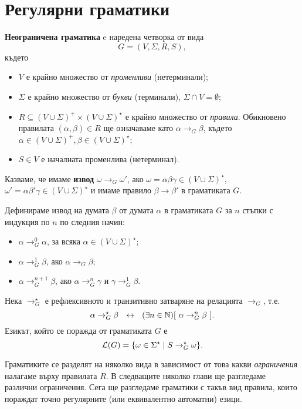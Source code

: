 \section{Регулярни граматики}
\label{sect:regular-grammar}
{\bf Неограничена граматика} e наредена четворка от вида
\[G = (V, \Sigma, R, S),\]
където
\begin{itemize}
\item
  $V$ е крайно множество от {\em променливи} (нетерминали);
\item
  $\Sigma$ е крайно множество от {\em букви} (терминали), $\Sigma \cap V = \emptyset$;
\item
  $R \subseteq (V\cup\Sigma)^+ \times (V \cup \Sigma)^\star$ е крайно множество от {\em правила}.
  Обикновено правилата $(\alpha, \beta) \in R$ ще означаваме като 
  $\alpha \to_G \beta$, където $\alpha \in (V \cup \Sigma)^+, \beta \in (V \cup \Sigma)^\star$;
\item
  $S \in V$ е началната променлива (нетерминал). 
\end{itemize}
Казваме, че имаме {\bf извод} $\omega \to_G \omega'$, ако $\omega = \alpha\beta\gamma \in (V\cup\Sigma)^\star$,
$\omega' = \alpha\beta'\gamma \in (V\cup\Sigma)^\star$ и имаме правило $\beta \to \beta'$ в граматиката $G$.

Дефинираме извод на думата $\beta$ от думата $\alpha$ в граматиката $G$ за $n$ стъпки с индукция по $n$ по следния начин:
\begin{itemize}
\item
  $\alpha \to^0_G \alpha$, за всяка $\alpha \in (V \cup \Sigma)^\star$;
\item
  $\alpha \to^1_G \beta$, ако $\alpha \to_G \beta$;
\item
  $\alpha \to^{n+1}_G \beta$, ако $\alpha \to^n_G \gamma$ и $\gamma \to^1_G \beta$.
\end{itemize}
Нека $\to^\star_G$ е рефлексивното и транзитивно затваряне на релацията $\to_G$, т.е.
\[ \alpha \to^\star_G \beta\ \iff\ (\exists n\in\Nat)[\ \alpha \to^n_G \beta\ ].\]
Езикът, който се поражда от граматиката $G$ е
\[\mathcal{L}(G) = \{\omega \in \Sigma^\star \mid S \to^\star_G \omega\}.\]

Граматиките се разделят на няколко вида в зависимост от това какви {\em ограничения} налагаме върху правилата $R$.
В следващите няколко глави ще разгледаме различни ограничения. Сега ще разгледаме граматики с такъв вид правила,
които пораждат точно регулярните (или еквивалентно автоматни) езици.


